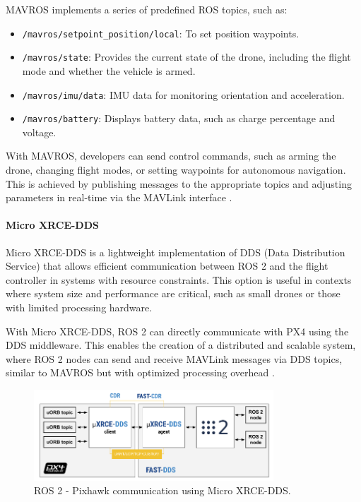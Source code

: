             MAVROS implements a series of predefined ROS topics, such as:
            \begin{itemize}
                \item \texttt{/mavros/setpoint\_position/local}: To set position waypoints.
                \item \texttt{/mavros/state}: Provides the current state of the drone, including the flight mode and whether the vehicle is armed.
                \item \texttt{/mavros/imu/data}: IMU data for monitoring orientation and acceleration.
                \item \texttt{/mavros/battery}: Displays battery data, such as charge percentage and voltage.
            \end{itemize}
            
            With MAVROS, developers can send control commands, such as arming the drone, changing flight modes, or setting waypoints for autonomous navigation. This is achieved by publishing messages to the appropriate topics and adjusting parameters in real-time via the MAVLink interface \cite{px4_ros2}.
            
            \begin{figure}
                \centering
                \label{fig:mavros}
            \end{figure}

            \paragraph{Micro XRCE-DDS}
            Micro XRCE-DDS is a lightweight implementation of DDS (Data Distribution Service) that allows efficient communication between ROS 2 and the flight controller in systems with resource constraints. This option is useful in contexts where system size and performance are critical, such as small drones or those with limited processing hardware.
    
            With Micro XRCE-DDS, ROS 2 can directly communicate with PX4 using the DDS middleware. This enables the creation of a distributed and scalable system, where ROS 2 nodes can send and receive MAVLink messages via DDS topics, similar to MAVROS but with optimized processing overhead \cite{px4_ros2}.
    
            \begin{figure}[H]
                \centering
                \includegraphics[width=0.8\textwidth]{pictures/xrce_dds.png} 
                \caption{ROS 2 - Pixhawk communication using Micro XRCE-DDS.}
                \label{fig:xrce_dds}
            \end{figure}

